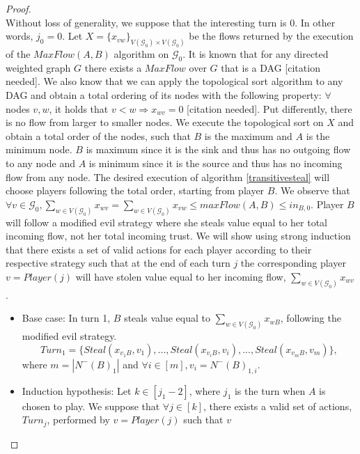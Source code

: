 \documentclass[11pt]{article}
\theoremstyle{definition}
\theoremstyle{corollary}
\theoremstyle{lemma}
\begin{document}
    \begin{proof} \ \\
       Without loss of generality, we suppose that the interesting turn is 0. In other words, $j_0 = 0$. Let $X =
       \{x_{vw}\}_{V(\mathcal{G}_0) \times V(\mathcal{G}_0)}$ be the flows returned by the execution of the $MaxFlow(A, B)$
       algorithm on $\mathcal{G}_0$. It is known that for any directed weighted graph $G$ there exists a $MaxFlow$ over $G$
       that is a DAG [citation needed]. We also know that we can apply the topological sort algorithm to any DAG and obtain a
       total ordering of its nodes with the following property: $\forall$ nodes $v, w$, it holds that
       $v < w \Rightarrow x_{wv} = 0$ [citation needed]. Put differently, there is no flow from larger to smaller nodes. We
       execute the topological sort on $X$ and obtain a total order of the nodes, such that $B$ is the maximum and
       $A$ is the minimum node. $B$ is maximum since it is the sink and thus has no outgoing flow to any node and $A$ is
       minimum since it is the source and thus has no incoming flow from any node. The desired execution of algorithm
       \ref{transitivesteal} will choose players following the total order, starting from player $B$. We observe that
       $\forall v \in \mathcal{G}_0, \sum\limits_{w \in V(\mathcal{G}_0)}x_{wv} = \sum\limits_{w \in V(\mathcal{G}_0)}x_{vw}
       \leq maxFlow(A, B) \leq in_{B, 0}$. Player $B$ will follow a modified evil strategy where she steals value equal to
       her total incoming flow, not her total incoming trust. We will show using strong induction that there exists a set of
       valid actions for each player according to their respective strategy such that at the end of each turn $j$ the
       corresponding player $v = Player(j)$ will have stolen value equal to her incoming flow,
       $\sum\limits_{w \in V(\mathcal{G}_0)}x_{wv}$.
       \begin{itemize}
          \item Base case: In turn 1, $B$ steals value equal to $\sum\limits_{w \in V(\mathcal{G}_0)}x_{wB}$, following the
          modified evil strategy. $$Turn_1 = \{Steal(x_{v_1B}, v_1), ..., Steal(x_{v_iB}, v_i), ...,Steal(x_{v_mB},
          v_m)\},$$ where $m = |N^{-}(B)_1|$ and $\forall i \in [m], v_i = N^{-}(B)_{1, i}$.
          \item Induction hypothesis: Let $k \in [j_1 - 2]$, where $j_1$ is the turn when $A$ is chosen to play. We suppose
          that $\forall j \in [k]$, there exists a valid set of actions, $Turn_j$, performed by $v = Player(j)$ such that $v$

\end{itemize}
\end{proof}
\end{document}
